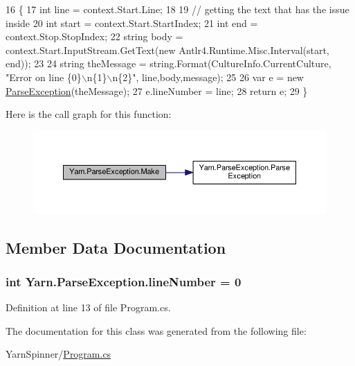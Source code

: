 \begin{DoxyCode}
16         \{
17             \textcolor{keywordtype}{int} line = context.Start.Line;
18 
19             \textcolor{comment}{// getting the text that has the issue inside}
20             \textcolor{keywordtype}{int} start = context.Start.StartIndex;
21             \textcolor{keywordtype}{int} end = context.Stop.StopIndex;
22             \textcolor{keywordtype}{string} body = context.Start.InputStream.GetText(\textcolor{keyword}{new} Antlr4.Runtime.Misc.Interval(start, end));
23 
24             \textcolor{keywordtype}{string} theMessage = string.Format(CultureInfo.CurrentCulture, \textcolor{stringliteral}{"Error on line \{0\}\(\backslash\)n\{1\}\(\backslash\)n\{2\}"}, 
      line,body,message);
25 
26             var e = \textcolor{keyword}{new} \hyperlink{a00137_aa3c4f5c8b0ae86097bbc46044df9f317}{ParseException}(theMessage);
27             e.lineNumber = line;
28             \textcolor{keywordflow}{return} e;
29         \}
\end{DoxyCode}


Here is the call graph for this function\-:
\nopagebreak
\begin{figure}[H]
\begin{center}
\leavevmode
\includegraphics[width=350pt]{a00137_a0265905b09fbd675d40c452d9fc61207_cgraph}
\end{center}
\end{figure}




\subsection{Member Data Documentation}
\hypertarget{a00137_ab335169367e64fd6d89d58b3ac573751}{
\subsubsection[{line\-Number}]{\setlength{\rightskip}{0pt plus 5cm}int Yarn.\-Parse\-Exception.\-line\-Number = 0\hspace{0.3cm}{\ttfamily [package]}}}\label{a00137_ab335169367e64fd6d89d58b3ac573751}


Definition at line 13 of file Program.\-cs.



The documentation for this class was generated from the following file\-:\begin{DoxyCompactItemize}
\item 
Yarn\-Spinner/\hyperlink{a00292}{Program.\-cs}\end{DoxyCompactItemize}
